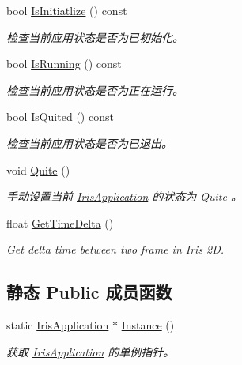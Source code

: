 \begin{DoxyCompactItemize}
bool \hyperlink{class_iris2_d_1_1_iris_application_ab7a5b7f956f23d3fb3d2ee0de573cb53}{Is\+Initiatlize} () const
\begin{DoxyCompactList}\small\item\em 检查当前应用状态是否为已初始化。 \end{DoxyCompactList}\item 
bool \hyperlink{class_iris2_d_1_1_iris_application_a795cea1f5d8112a7db7d6429f306a5ff}{Is\+Running} () const
\begin{DoxyCompactList}\small\item\em 检查当前应用状态是否为正在运行。 \end{DoxyCompactList}\item 
bool \hyperlink{class_iris2_d_1_1_iris_application_ae9760ff496a4c80f96ad49331407c2e4}{Is\+Quited} () const
\begin{DoxyCompactList}\small\item\em 检查当前应用状态是否为已退出。 \end{DoxyCompactList}\item 
void \hyperlink{class_iris2_d_1_1_iris_application_adca8cada1a8841c3f409e856f6878331}{Quite} ()
\begin{DoxyCompactList}\small\item\em 手动设置当前 \hyperlink{class_iris2_d_1_1_iris_application}{Iris\+Application} 的状态为 Quite 。 \end{DoxyCompactList}\item 
float \hyperlink{class_iris2_d_1_1_iris_application_a3b8f4de1902aeda08acbe243aad34f15}{Get\+Time\+Delta} ()
\begin{DoxyCompactList}\small\item\em Get delta time between two frame in Iris 2D. \end{DoxyCompactList}\end{DoxyCompactItemize}
\subsection*{静态 Public 成员函数}
\begin{DoxyCompactItemize}
\item 
static \hyperlink{class_iris2_d_1_1_iris_application}{Iris\+Application} $\ast$ \hyperlink{class_iris2_d_1_1_iris_application_ab2a9826c10d90732f398859782817f8e}{Instance} ()
\begin{DoxyCompactList}\small\item\em 获取 \hyperlink{class_iris2_d_1_1_iris_application}{Iris\+Application} 的单例指针。 \end{DoxyCompactList}\end{DoxyCompactItemize}


